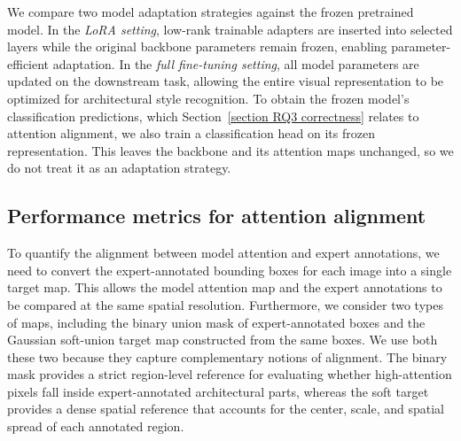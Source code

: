 \documentclass[lineno,pdflatex,sn-mathphys-num]{sn-jnl}%
\theoremstyle{thmstyleone}%
\theoremstyle{thmstyletwo}%
\theoremstyle{thmstylethree}%
\begin{document}
We compare two model adaptation strategies against the frozen pretrained model. In the \textit{LoRA setting}, low-rank trainable adapters are inserted into selected layers while the original backbone parameters remain frozen, enabling parameter-efficient adaptation. In the \textit{full fine-tuning setting}, all model parameters are updated on the downstream task, allowing the entire visual representation to be optimized for architectural style recognition. To obtain the frozen model's classification predictions, which Section~\ref{section RQ3 correctness} relates to attention alignment, we also train a classification head on its frozen representation. This leaves the backbone and its attention maps unchanged, so we do not treat it as an adaptation strategy.

\subsection{Performance metrics for attention alignment}

To quantify the alignment between model attention and expert annotations, we need to convert the expert-annotated bounding boxes for each image into a single target map. This allows the model attention map and the expert annotations to be compared at the same spatial resolution. Furthermore, we consider two types of maps, including the binary union mask of expert-annotated boxes and the Gaussian soft-union target map constructed from the same boxes. We use both these two because they capture complementary notions of alignment. The binary mask provides a strict region-level reference for evaluating whether high-attention pixels fall inside expert-annotated architectural parts, whereas the soft target provides a dense spatial reference that accounts for the center, scale, and spatial spread of each annotated region.
\end{document}
